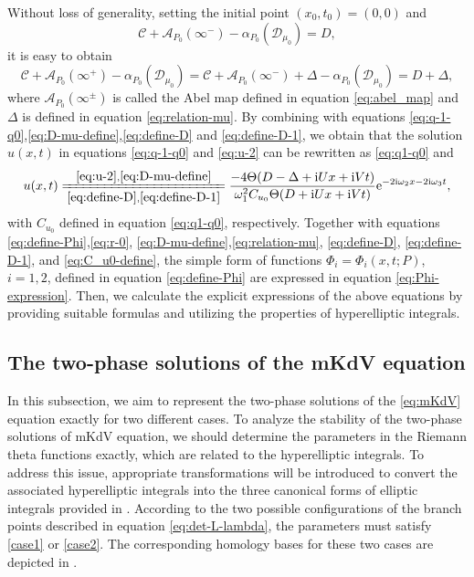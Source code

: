 \documentclass[11pt,reqno]{amsart}
\newcommand{\ii}{\mathrm{i}}
\newcommand{\ee}{\mathrm{e}}
\numberwithin{equation}{section}
\begin{document}
Without loss of generality, setting the initial point $(x_0,t_0)=(0,0)$ and
\begin{equation}\label{eq:define-D}
	\mathcal{C}+\mathcal{A}_{P_0}(\infty^{-})-\alpha_{P_0}(\mathcal{D}_{\mu_0})=D,
\end{equation}
it is easy to obtain
\begin{equation}\label{eq:define-D-1}
	\mathcal{C}+\mathcal{A}_{P_0}(\infty^{+})-\alpha_{P_0}(\mathcal{D}_{\mu_0})=\mathcal{C}+\mathcal{A}_{P_0}(\infty^{-})+\Delta-\alpha_{P_0}(\mathcal{D}_{\mu_0})=D+\Delta,
\end{equation} 
where $\mathcal{A}_{P_0}(\infty^{\pm})$ is called the Abel map defined in equation \ref{eq:abel_map} and $\Delta$ is defined in equation \eqref{eq:relation-mu}.
By combining with equations \eqref{eq:q-1-q0},\eqref{eq:D-mu-define},\eqref{eq:define-D} and \eqref{eq:define-D-1},
we obtain that the solution $u(x,t)$ in equations \eqref{eq:q-1-q0} and \eqref{eq:u-2} can be rewritten as \eqref{eq:q1-q0} and 
\begin{equation}\label{eq:C_u0-define}
	 u(x,t)\xlongequal[\eqref{eq:define-D},\eqref{eq:define-D-1}]{\eqref{eq:u-2},\eqref{eq:D-mu-define}} \frac{ -4\Theta(D-\Delta+\ii Ux+\ii V t)}{\omega_1^2C_{u_0} \Theta(D+\ii Ux+\ii V t)}\ee^{-2\ii \omega_2 x-2\ii \omega_3 t},
\end{equation}
with $C_{u_0}$ defined in equation \eqref{eq:q1-q0}, respectively.
Together with equations  \eqref{eq:define-Phi},\eqref{eq:r-0}, \eqref{eq:D-mu-define},\eqref{eq:relation-mu}, \eqref{eq:define-D}, \eqref{eq:define-D-1}, and \eqref{eq:C_u0-define}, the simple form of functions $\Phi_{i}=\Phi_{i}(x,t;P)$, $i=1,2$, defined in equation \eqref{eq:define-Phi} are expressed in equation  \eqref{eq:Phi-expression}.
Then, we calculate the explicit expressions of the above equations by providing suitable formulas and utilizing the properties of hyperelliptic integrals.


\subsection{The two-phase solutions of the mKdV equation}\label{section:exact-solution}

In this subsection, we aim to represent the two-phase solutions of the \ref{eq:mKdV} equation exactly for two different cases. 
To analyze the stability of the two-phase solutions of mKdV equation, we should determine the parameters in the Riemann theta functions exactly, which are related to the hyperelliptic integrals.
To address this issue, appropriate transformations will be introduced to convert the associated hyperelliptic integrals into the three canonical forms of elliptic integrals provided in . 
According to the two possible configurations of the branch points described in equation \eqref{eq:det-L-lambda}, the parameters must satisfy \ref{case1} or \ref{case2}.
The corresponding homology bases for these two cases are depicted in .
\end{document}
